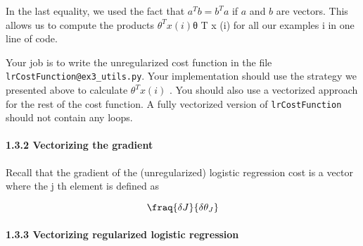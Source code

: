 \documentclass[11pt]{article}
\begin{document}
In the last equality, we used the fact that \(a^Tb = b^Ta\) if \(a\) and
\(b\) are vectors. This allows us to compute the products
\(\theta^Tx(i)\)θ T x (i) for all our examples i in one line of code.

Your job is to write the unregularized cost function in the file
\texttt{lrCostFunction@ex3\_utils.py}. Your implementation should use
the strategy we presented above to calculate \(\theta^Tx(i)\) . You
should also use a vectorized approach for the rest of the cost function.
A fully vectorized version of \texttt{lrCostFunction} should not contain
any loops.

\paragraph{1.3.2 Vectorizing the
gradient}\label{vectorizing-the-gradient}

Recall that the gradient of the (unregularized) logistic regression cost
is a vector where the j th element is defined as

\[ \fraq{\delta J}{\delta \theta_J}\]

\paragraph{1.3.3 Vectorizing regularized logistic
regression}\label{vectorizing-regularized-logistic-regression}
\end{document}
